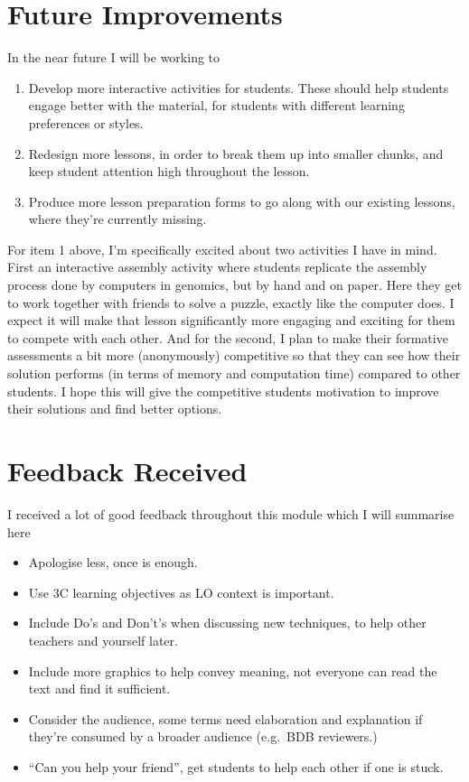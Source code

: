 \documentclass[paper=a4,justified,a4paper]{tufte-handout}
\providecommand{\tightlist}{%
  \setlength{\itemsep}{0pt}\setlength{\parskip}{0pt}}
\begin{document}
\hypertarget{future-improvements}{%
\section{Future Improvements}\label{future-improvements}}

In the near future I will be working to

\begin{enumerate}
\def\labelenumi{\arabic{enumi}.}
\tightlist
\item
  Develop more interactive activities for students. These should help
  students engage better with the material, for students with different
  learning preferences or styles.
\item
  Redesign more lessons, in order to break them up into smaller chunks,
  and keep student attention high throughout the lesson.
\item
  Produce more lesson preparation forms to go along with our existing
  lessons, where they're currently missing.
\end{enumerate}

For item 1 above, I'm specifically excited about two activities I have
in mind. First an interactive assembly activity where students replicate
the assembly process done by computers in genomics, but by hand and on
paper. Here they get to work together with friends to solve a puzzle,
exactly like the computer does. I expect it will make that lesson
significantly more engaging and exciting for them to compete with each
other. And for the second, I plan to make their formative assessments a
bit more (anonymously) competitive so that they can see how their
solution performs (in terms of memory and computation time) compared to
other students. I hope this will give the competitive students
motivation to improve their solutions and find better options.

\hypertarget{feedback-received}{%
\section{Feedback Received}\label{feedback-received}}

I received a lot of good feedback throughout this module which I will
summarise here

\begin{itemize}
\tightlist
\item
  Apologise less, once is enough.
\item
  Use 3C learning objectives as LO context is important.
\item
  Include Do's and Don't's when discussing new techniques, to help other
  teachers and yourself later.
\item
  Include more graphics to help convey meaning, not everyone can read
  the text and find it sufficient.
\item
  Consider the audience, some terms need elaboration and explanation if
  they're consumed by a broader audience (e.g.~BDB reviewers.)
\item
  ``Can you help your friend'', get students to help each other if one
  is stuck.
\end{itemize}
\end{document}
